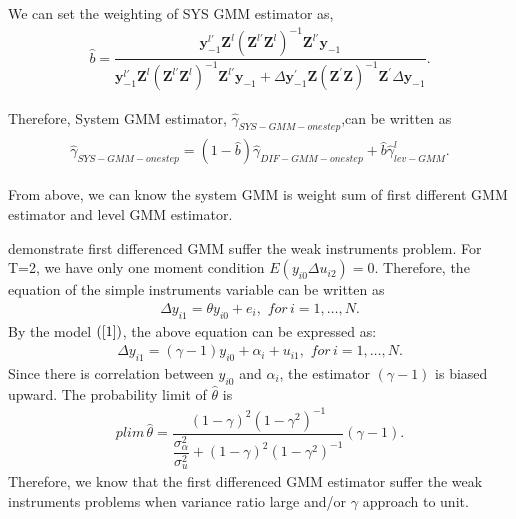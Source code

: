 \documentclass[12pt,a4paper,hyperref]{article}
\begin{document}
We can set the weighting of SYS GMM estimator as,
\begin{align}
\hat{b}=\dfrac{\boldsymbol{y}_{-1}^{l'}\boldsymbol{Z}^{l}\left( \boldsymbol{Z}^{l'}\boldsymbol{Z}^{l} \right)^{-1}\boldsymbol{Z}^{l'}\boldsymbol{y}_{-1}}{\boldsymbol{y}_{-1}^{l'}\boldsymbol{Z}^{l}\left( \boldsymbol{Z}^{l'}\boldsymbol{Z}^{l} \right)^{-1}\boldsymbol{Z}^{l'}\boldsymbol{y}_{-1}+\Delta \boldsymbol{y}_{-1}^{'}\boldsymbol{Z}\left( \boldsymbol{Z}^{'}\boldsymbol{Z} \right)^{-1}\boldsymbol{Z}^{'}\Delta \boldsymbol{y}_{-1}}.
\end{align}

Therefore, System GMM estimator, $\hat{\gamma}_{SYS-GMM-onestep}$,can be written as
\begin{align}
\begin{split}
\hat{\gamma}_{SYS-GMM-onestep}=\left(1- \hat{b}\right)\hat{\gamma}_{DIF-GMM-onestep}+ \hat{b} \hat{\gamma}^{l}_{lev-GMM}.
\end{split}
\end{align}

From above, we can know the system GMM is weight sum of first different GMM estimator and level GMM estimator.

\citet{Blundell:1998} demonstrate first differenced GMM suffer the weak instruments problem. For T=2, we have only one moment condition $E \left(y_{i0} \Delta u_{i2} \right)=0$. Therefore, the equation of the simple instruments variable can be written as
\begin{align}
\Delta y_{i1}=\theta y_{i0}+ e_{i}, \,\, for \,i=1,\ldots, N.
\end{align}
By the model $\left( \ref{1}\right)$, the above equation can be expressed as:
\begin{align}
\Delta y_{i1}=\left(\gamma-1\right) y_{i0}+\alpha_{i}+u_{i1}, \,\, for\, i=1,\ldots, N.
\end{align}
Since there is correlation between $y_{i0}$ and $\alpha_{i}$, the estimator $\left(\gamma-1 \right)$ is biased upward.
The probability limit of $\hat{\theta}$ is
\begin{align}
plim\,\hat{\theta} = \dfrac{\left(1-\gamma\right)^{2}\left(1-\gamma^{2} \right)^{-1}}{\dfrac{\sigma^{2}_{\alpha}}{\sigma^{2}_{u}}+\left(1-\gamma\right)^{2}\left(1-\gamma^{2} \right)^{-1}} \left( \gamma-1 \right).
\end{align}
Therefore, we know that the first differenced GMM estimator suffer the weak instruments problems when variance ratio large and/or $\gamma$ approach to unit.
\end{document}
